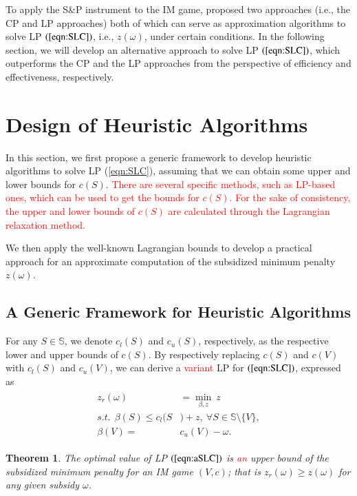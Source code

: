 \documentclass[authoryear,review,12pt]{elsarticle}
\newtheorem{theorem}{Theorem}
\begin{document}
To apply the S\&P instrument to the IM game, \cite{leastcore2018} proposed two approaches (i.e., the CP and LP approaches) both of which can serve as approximation algorithms to solve LP $(\ref{eqn:SLC})$, i.e., $z(\omega)$, under certain conditions.
In the following section, we will develop an alternative approach to solve LP $(\ref{eqn:SLC})$, which outperforms the CP and the LP approaches from the perspective of efficiency and effectiveness, respectively.



\section{Design of Heuristic Algorithms}\label{section:general}
In this section, we first propose a generic framework to develop heuristic algorithms to solve LP (\ref{eqn:SLC}), assuming that we can obtain some upper and lower bounds for $c(S)$.
\textcolor{red}{There are several specific methods, such as LP-based ones, which can be used to get the bounds for $c(S)$. For the sake of consistency, the upper and lower bounds of $c(S)$ are calculated through the Lagrangian relaxation method.}

We then apply the well-known Lagrangian bounds to
develop a practical approach for an approximate computation of the subsidized minimum penalty $z(\omega)$.


\subsection{A Generic Framework for Heuristic Algorithms}

For any $S \in \mathbb{S}$, we denote $c_l(S)$ and $c_u(S)$, respectively, as the respective lower and upper bounds of $c(S)$. By respectively replacing $c(S)$ and $c(V)$ with $c_l(S)$ and $c_u(V)$, we can derive a \textcolor{red}{variant} LP for $(\ref{eqn:SLC})$,
expressed as
\begin{eqnarray}\label{eqn:aSLC}
\begin{aligned}
z_r(\omega) &= \min_{\beta,z}~ z\\
s.t.~~\beta(S) \leq c_l(S&)+z,~\forall S \in \mathbb{S} \setminus \big\{V\big\},\\
\beta(V)=&c_u(V)-\omega.
\end{aligned}
\end{eqnarray}


\begin{theorem}\label{thm:rb}
The optimal value of LP $(\ref{eqn:aSLC})$ is \textcolor{red}{an} upper bound of the subsidized minimum penalty for an IM game $(V,c)$; that is $z_r(\omega) \geq z(\omega)$ for any given subsidy $\omega$.
\end{theorem}
\end{document}
